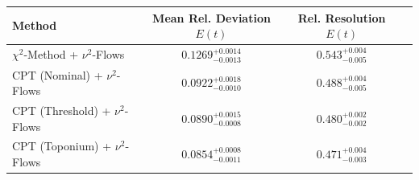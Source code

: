     \begin{tabular}{lccc}
        \toprule
        Method & Mean Rel. Deviation $E(t)$ & Rel. Resolution $E(t)$ \\
        \midrule
        $\chi^2$-Method + $\nu^2$-Flows & $0.1269^{+0.0014}_{-0.0013}$ & $0.543^{+0.004}_{-0.005}$ \\
        CPT (Nominal) + $\nu^2$-Flows & $0.0922^{+0.0018}_{-0.0010}$ & $0.488^{+0.004}_{-0.005}$ \\
        CPT (Threshold) + $\nu^2$-Flows & $0.0890^{+0.0015}_{-0.0008}$ & $0.480^{+0.002}_{-0.002}$ \\
        CPT (Toponium) + $\nu^2$-Flows & $0.0854^{+0.0008}_{-0.0011}$ & $0.471^{+0.004}_{-0.003}$ \\
        \bottomrule
    \end{tabular}